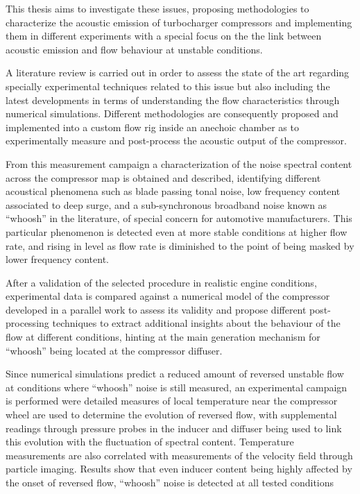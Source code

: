 \documentclass[final,twoside,11pt]{book}
\numberwithin{equation}{section}
\numberwithin{figure}{chapter}
\numberwithin{table}{chapter}
\begin{document}
This thesis aims to investigate these issues, proposing methodologies to characterize the acoustic emission of turbocharger compressors and implementing them in different experiments with a special focus on the the link between acoustic emission and flow behaviour at unstable conditions.

A literature review is carried out in order to assess the state of the art regarding specially experimental techniques related to this issue but also including the latest developments in terms of understanding the flow characteristics through numerical simulations. Different methodologies are consequently proposed and implemented into a custom flow rig inside an anechoic chamber as to experimentally measure and post-process the acoustic output of the compressor.

From this measurement campaign a characterization of the noise spectral content across the compressor map is obtained and described, identifying different acoustical phenomena such as blade passing tonal noise, low frequency content associated to deep surge, and a sub-synchronous broadband noise known as ``whoosh'' in the literature, of special concern for automotive manufacturers. This particular phenomenon is detected even at more stable conditions at higher flow rate, and rising in level as flow rate is diminished to the point of being masked by lower frequency content.

After a validation of the selected procedure in realistic engine conditions, experimental data is compared against a numerical model of the compressor developed in a parallel work to assess its validity and propose different post-processing techniques to extract additional insights about the behaviour of the flow at different conditions, hinting at the main generation mechanism for ``whoosh'' being located at the compressor diffuser.

Since numerical simulations predict a reduced amount of reversed unstable flow at conditions where ``whoosh'' noise is still measured, an experimental campaign is performed were detailed measures of local temperature near the compressor wheel are used to determine the evolution of reversed flow, with supplemental readings through pressure probes in the inducer and diffuser being used to link this evolution with the fluctuation of spectral content. Temperature measurements are also correlated with measurements of the velocity field through particle imaging. Results show that even inducer content being highly affected by the onset of reversed flow, ``whoosh'' noise is detected at all tested conditions
\end{document}
